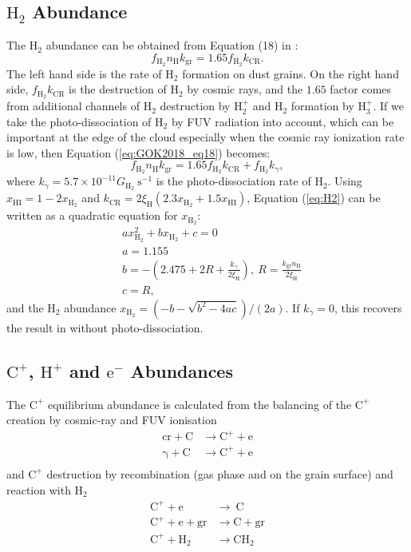 \documentclass[iop,numberedappendix]{emulateapj}
\newcommand{\mr}{\mathrm}
\newcommand{\Ht}{\mathrm{H_2}}
\newcommand{\Ho}{\mathrm{H}}
\newcommand{\HI}{\mathrm{HI}}
\newcommand{\Hplus}{\mathrm{H^+}}
\newcommand{\Cplus}{\mathrm{C^+}}
\begin{document}
\subsection{$\Ht$ Abundance\label{section:H2}}
The $\Ht$ abundance can be obtained from Equation (18) in \citet{GOK2018}:
\begin{equation}\label{eq:GOK2018_eq18}
    f_\Ht n_\Ho k_\mr{gr} = 1.65 f_\Ht k_\mr{CR}.
\end{equation}
The left hand side is the rate of $\Ht$ formation on dust grains. On the right
hand side, $f_\Ht k_\mr{CR}$ is the destruction of $\Ht$ by cosmic rays, and
the $1.65$ factor comes from additional channels of $\Ht$ destruction by
$\mr{H_2^+}$ and $\Ht$ formation by $\mr{H_3^+}$. If we take the
photo-dissociation of $\Ht$ by FUV radiation into account, which can be
important at the edge of the cloud especially when the cosmic ray ionization
rate is low, then Equation (\ref{eq:GOK2018_eq18}) becomes:
\begin{equation}\label{eq:H2}
    f_\Ht n_\Ho k_\mr{gr} = 1.65 f_\Ht k_\mr{CR} + f_\Ht k_\gamma,
\end{equation}
where $k_\gamma=5.7\times 10^{-11}G_\Ht~\mr{s^{-1}}$ is the photo-dissociation
rate of $\Ht$. Using $x_\HI = 1-2x_\Ht$ and
$k_\mr{CR}=2\xi_\Ho(2.3x_\Ht+1.5x_\HI)$, Equation (\ref{eq:H2}) can be written
as a quadratic equation for $x_\Ht$:
\begin{align}
    &a x_\Ht^2 + bx_\Ht + c = 0\\
    &a = 1.155\\
    &b=- (2.475 + 2R + \frac{k_\gamma}{2\xi_\Ho}),
    ~R=\frac{k_\mr{gr}n_\Ho}{2\xi_\Ho}\\
    &c=R,
\end{align}
and the $\Ht$ abundance $x_\Ht=(-b - \sqrt{b^2 - 4ac} )/(2a)$. If $k_\gamma=0$,
this recovers the result in \citet{GOK2018} without photo-dissociation.

\subsection{$\Cplus$, $\Hplus$ and $\mr{e^{-}}$ Abundances\label{section:e}}
The $\Cplus$ equilibrium abundance is calculated from the balancing of the
$\Cplus$ creation by cosmic-ray and FUV ionisation
\begin{align*}
    \mr{cr + C }&\mr{\rightarrow C^+ + e}\\
    \mr{\gamma + C }&\mr{\rightarrow C^+ + e}\\
\end{align*}
and $\Cplus$ destruction by recombination (gas phase and on the grain surface)
and reaction with $\Ht$
\begin{align*}
    \mr{C^+ + e }&\mr{\rightarrow\ C}\\
    \mr{C^+ + e + gr }&\mr{\rightarrow C + gr}\\
    \mr{C^+ + H_2 }&\mr{\rightarrow CH_2}
\end{align*}
\end{document}
